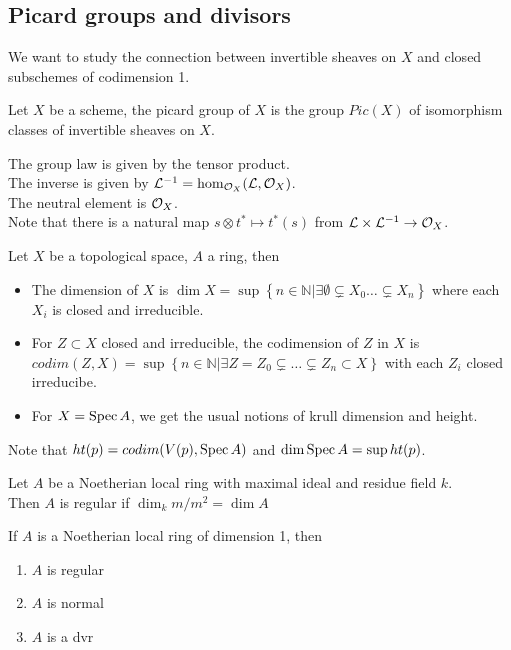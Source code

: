 \documentclass[../main.tex]{subfiles}
\begin{document}
\subsection{Picard groups and divisors}
We want to study the connection between invertible sheaves on $X$ and closed subschemes of codimension 1.\\
\begin{defn}
	Let $X$ be a scheme, the picard group of $X$ is the group $ Pic( X) $ of isomorphism classes of invertible sheaves on $X$.
\end{defn}
The group law is given by the tensor product.\\
The inverse is given by $ \mathcal{L}^{-1}= \hom_{\mathcal{O}_X} (  \mathcal{L}, \mathcal{O}_X) $.\\
The neutral element is $\mathcal{O}_X$.\\
Note that there is a natural map $s\otimes t^{\ast}\mapsto t^{\ast}( s) $ from $ \mathcal{L}\times \mathcal{L}^{-1}\to \mathcal{O}_X$.
\begin{defn}[Dimension]
	Let $X$ be a topological space, $A$ a ring, then
	\begin{itemize}
	\item The dimension of $X$ is $\dim X= \sup \left\{ n \in \mathbb{N}| \exists \emptyset \subsetneq X_0 \ldots \subsetneq X_n \right\} $ where each $X_i$ is closed and irreducible.
	\item For $Z \subset X$ closed and irreducible, the codimension of $Z$ in $X$ is $codim( Z,X) = \sup \left\{ n \in \mathbb{N}| \exists Z= Z_0 \subsetneq\ldots \subsetneq Z_n \subset X \right\} $ with each $Z_i$ closed irreducibe.
	\item For $X= \operatorname{Spec} A$, we get the usual notions of krull dimension and height.
	\end{itemize}
\end{defn}
Note that $ht( p) = codim( V( p) , \operatorname{Spec} A) $ and $\dim \operatorname{Spec} A= \sup ht( p) $.
\begin{defn}
	Let $A$ be a Noetherian local ring with maximal ideal and residue field $k$.\\
	Then $A$ is regular if $\dim_k m /m^{2} = \dim A$ 	
\end{defn}
\begin{propo}
If $A$ is a Noetherian local ring of dimension 1, then
\begin{enumerate}
\item $A$ is regular
\item $A$ is normal
\item $A$ is a dvr
\end{enumerate}
\end{propo}
\end{document}
